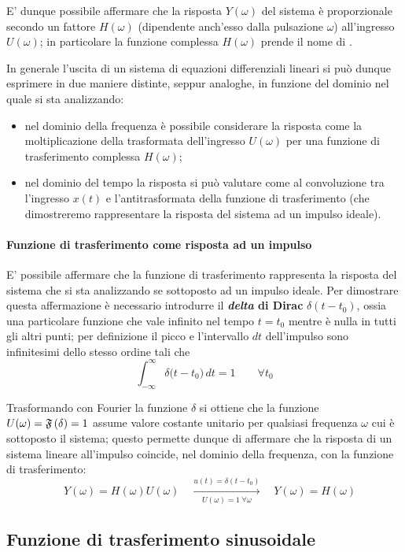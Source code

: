 			E' dunque possibile affermare che la risposta $Y(\omega)$ del sistema è proporzionale secondo un fattore $H(\omega)$ (dipendente anch'esso dalla pulsazione $\omega$) all'ingresso $U(\omega)$; in particolare la funzione complessa $H(\omega)$ prende il nome di .
			
			In generale l'uscita di un sistema di equazioni differenziali lineari si può dunque esprimere in due maniere distinte, seppur analoghe, in funzione del dominio nel quale si sta analizzando:
			\begin{itemize}
				\item nel dominio della frequenza è possibile considerare la risposta come la moltiplicazione della trasformata dell'ingresso $U(\omega)$ per una funzione di trasferimento complessa $H(\omega)$;
				\item nel dominio del tempo la risposta si può valutare come al convoluzione tra l'ingresso $x(t)$ e l'antitrasformata della funzione di trasferimento (che dimostreremo rappresentare la risposta del sistema ad un impulso ideale).
			\end{itemize}
			
			\paragraph{Funzione di trasferimento come risposta ad un impulso} E' possibile affermare che la funzione di trasferimento rappresenta la risposta del sistema che si sta analizzando se sottoposto ad un impulso ideale. Per dimostrare questa affermazione è necessario introdurre il \textbf{\textit{delta} di Dirac} $\delta(t-t_0)$, ossia una particolare funzione che vale infinito nel tempo $t= t_0$ mentre è nulla in tutti gli altri punti; per definizione il picco e l'intervallo $dt$ dell'impulso sono infinitesimi dello stesso ordine tali che
			\[ \int_{-\infty}^\infty \delta\big(t-t_0\big)\, dt = 1 \qquad \forall t_0 \]
			
			Trasformando con Fourier la funzione $\delta$ si ottiene che la funzione $U(\omega) = \mathfrak F \left(\delta\right) = 1$ assume valore costante unitario per qualsiasi frequenza $\omega$ cui è sottoposto il sistema; questo permette dunque di affermare che la risposta di un sistema lineare all'impulso coincide, nel dominio della frequenza, con la funzione di trasferimento:
			\[ \quad Y(\omega) = H(\omega) U(\omega) \quad \xrightarrow[U(\omega)=1 \ \forall \omega]{u(t) = \delta(t-t_0)} \quad Y(\omega) = H(\omega) \]
			
	\subsection{Funzione di trasferimento sinusoidale}
		
